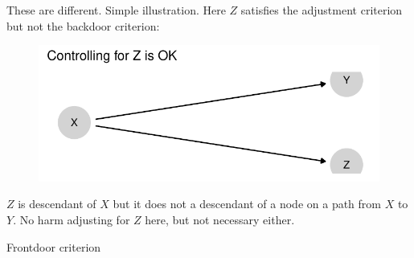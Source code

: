 \documentclass[
  11pt,
  ignorenonframetext,
]{beamer}
\begin{document}
\begin{frame}{These are different. Simple illustration.}
\protect\hypertarget{these-are-different.-simple-illustration.}{}
Here \(Z\) satisfies the adjustment criterion but not the backdoor
criterion:

\begin{figure}

{\centering \includegraphics{0_lectures_files/figure-beamer/unnamed-chunk-240-1.pdf}

}

\end{figure}

\(Z\) is descendant of \(X\) but it does not a descendant of a node on a
path from \(X\) to \(Y\). No harm adjusting for \(Z\) here, but not
necessary either.
\end{frame}

\begin{frame}{Frontdoor criterion}
\protect\hypertarget{frontdoor-criterion}{}
\end{frame}
\end{document}
